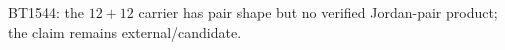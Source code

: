 \begin{center}\small
BT1544: the $12+12$ carrier has pair shape but no verified Jordan-pair product; the claim remains external/candidate.
\end{center}
